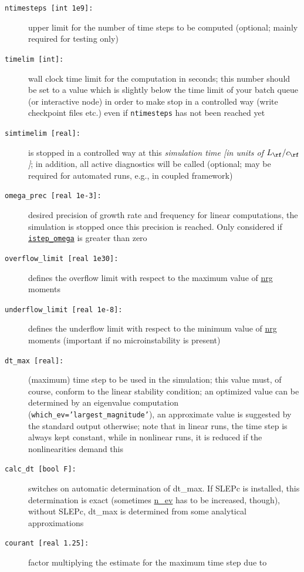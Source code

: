 \documentclass[12pt]{article}
\begin{document}
\begin{description}
\item[\texttt{ntimesteps [int 1e9]:}] upper limit for the number of time steps to be computed (optional; mainly required for testing only)
\item[\hypertarget{timelim}{\texttt{timelim [int]:}}] wall clock time limit for the \gene computation in seconds; this number
  should be set to a value which is slightly below the time limit of your batch queue (or interactive
  node) in order to make \gene stop in a  controlled way (write checkpoint files etc.) even if
  \texttt{ntimesteps} has not been reached yet
\item[\texttt{simtimelim [real]:}] \gene is stopped in a controlled way at this {\em simulation time [in units of
 $L_\rf/c_\rf$]}; in addition, all active diagnostics will be called (optional; may be required for automated \gene runs, e.g., in coupled framework)
\item[\hypertarget{omega_prec}{\tt omega\_prec [real 1e-3]:}]
  desired precision of growth rate and frequency for linear computations, the simulation is stopped once
  this precision is reached. Only considered if \hyperlink{istep_omega}{\tt istep\_omega} is greater than zero
\item[{\tt overflow\_limit [real 1e30]:}] defines the overflow limit with respect to the maximum
  value of \hyperref[subsec:nrg-file]{nrg} moments
\item[{\tt underflow\_limit [real 1e-8]:}] defines the underflow limit with respect to the minimum
  value of \hyperref[subsec:nrg-file]{nrg} moments (important if no microinstability is present)
\item[\texttt{dt\_max [real]:}] (maximum) time step to be used in the simulation; this value must,
  of course, conform to the linear stability condition; an optimized value can be determined by an
  eigenvalue computation \\(\texttt{which\_ev='largest\_magnitude'}), an approximate value is suggested by the \gene
  standard output otherwise; note that in linear runs, the time step is always kept constant,
  while in nonlinear runs, it is reduced if the nonlinearities demand this
\item[\texttt{calc\_dt [bool F]:}] switches on automatic determination of dt\_max. If SLEPc is installed,
  this determination is exact (sometimes \hyperlink{n_ev}{n\_ev} has to be increased,
  though), without SLEPc, dt\_max is determined from some analytical approximations
\item[\texttt{courant [real 1.25]:}] factor multiplying the estimate for the maximum time step due to

\end{description}
\end{document}
